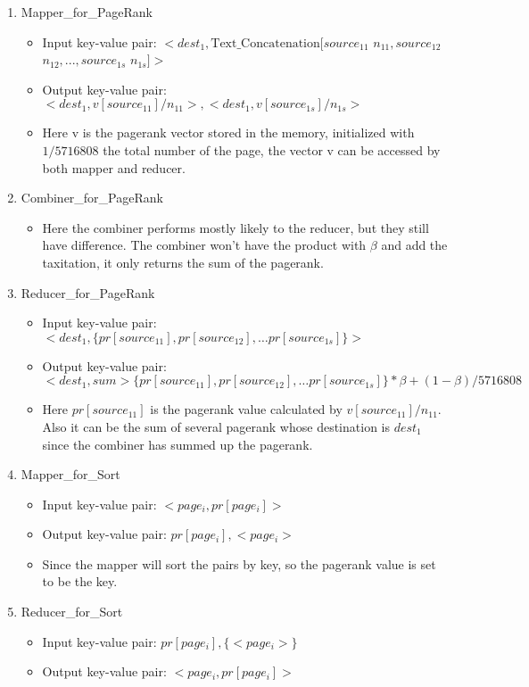\documentclass[a4paper]{article}
\begin{document}
\begin{enumerate}
	\item Mapper\_for\_PageRank
	\begin{itemize}
		\item Input key-value pair: $<dest_1, \mbox{Text\_Concatenation}[source_{11}$ $n_{11}, source_{12}$ $n_{12}, ..., source_{1s}$ $n_{1s}]>$
		\item Output key-value pair: $<dest_{1}, v[source_{11}] / n_{11}>, <dest_{1}, v[source_{1s}] / n_{1s}>$
		\item Here v is the pagerank vector stored in the memory, initialized with $1 / 5716808$ the total number of the page, the vector v can be accessed by both mapper and reducer.	
	\end{itemize}
	\item Combiner\_for\_PageRank
	\begin{itemize}
		\item Here the combiner performs mostly likely to the reducer, but they still have difference. The combiner won't have the product with $\beta$ and add the taxitation, it only returns the sum of the pagerank.
	\end{itemize}
	\item Reducer\_for\_PageRank
	\begin{itemize}
		\item Input key-value pair: $<dest_{1}, \{pr[source_{11}], pr[source_{12}], \dots pr[source_{1s}]\}>$
		\item Output key-value pair: $<dest_{1}, sum>\{pr[source_{11}], pr[source_{12}], \dots pr[source_{1s}]\} * \beta + (1-\beta) / 5716808$
		\item Here $pr[source_{11}]$ is the pagerank value calculated by $v[source_{11}] / n_{11}$. Also it can be the sum of several pagerank whose destination is $dest_1$ since the combiner has summed up the pagerank.
	\end{itemize}
	\item Mapper\_for\_Sort
	\begin{itemize}
		\item Input key-value pair: $<page_i, pr[page_i]>$
		\item Output key-value pair: $pr[page_i], <page_i>$
		\item Since the mapper will sort the pairs by key, so the pagerank value is set to be the key.
	\end{itemize}
	
	\item Reducer\_for\_Sort
	\begin{itemize}
		\item Input key-value pair: $pr[page_i], \{<page_i>\}$
		\item Output key-value pair: $<page_i, pr[page_i]>$
	\end{itemize}
	
\end{enumerate}
\end{document}
